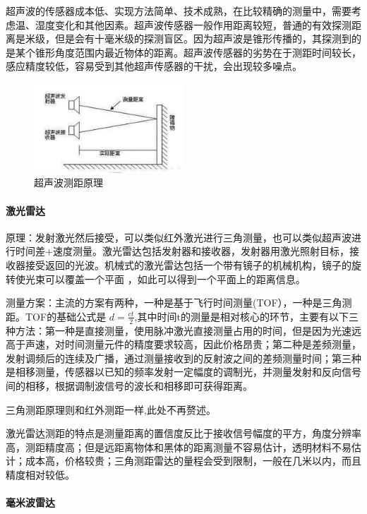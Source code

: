 \documentclass{report}
\begin{document}
超声波的传感器成本低、实现方法简单、技术成熟，在比较精确的测量中，需要考虑温、湿度变化和其他因素。超声波传感器一般作用距离较短，普通的有效探测距离是米级，但是会有十毫米级的探测盲区。因为超声波是锥形传播的，其探测到的是某个锥形角度范围内最近物体的距离。超声波传感器的劣势在于测距时间较长，感应精度较低，容易受到其他超声传感器的干扰，会出现较多噪点。
  \begin{figure}[ht]
    \centering
    \includegraphics[width=0.5\textwidth]{figures/super.png}
    \caption{超声波测距原理 }
  \end{figure}

  \paragraph{激光雷达}
  
原理：发射激光然后接受，可以类似红外激光进行三角测量，也可以类似超声波进行时间差+速度测量。激光雷达包括发射器和接收器，发射器用激光照射目标，接收器接受返回的光波。机械式的激光雷达包括一个带有镜子的机械机构，镜子的旋转使光束可以覆盖一个平面 ，如此可以得到一个平面上的距离信息。

测量方案：主流的方案有两种，一种是基于飞行时间测量(TOF），一种是三角测距。TOF的基础公式是 \( d=\frac{ct}{2} \),其中时间t的测量是相对核心的环节，主要有以下三种方法：第一种是直接测量，使用脉冲激光直接测量占用的时间，但是因为光速远高于声速，对时间测量元件的精度要求较高，因此价格昂贵；第二种是差频测量，发射调频后的连续及广播，通过测量接收到的反射波之间的差频测量时间；第三种是相移测量，传感器以已知的频率发射一定幅度的调制光，并测量发射和反向信号间的相移，根据调制波信号的波长和相移即可获得距离。

三角测距原理则和红外测距一样,此处不再赘述。

激光雷达测距的特点是测量距离的置信度反比于接收信号幅度的平方，角度分辨率高，测距精度高；但是远距离物体和黑体的距离测量不容易估计，透明材料不易估计；成本高，价格较贵；三角测距雷达的量程会受到限制，一般在几米以内，而且精度相对较低\cite{jh1}。
\newpage
  \paragraph{毫米波雷达}
  
\end{document}
